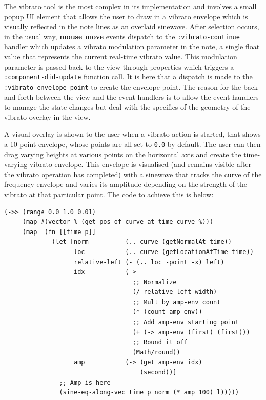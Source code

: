 \documentclass[12pt]{report}
\begin{document}
The vibrato tool is the most complex in its implementation and involves a small
popup UI element that allows the user to draw in a vibrato envelope which is
visually reflected in the note lines as an overlaid sinewave. After selection
occurs, in the usual way, \textbf{mouse move} events dispatch to the
\texttt{:vibrato-continue} handler which updates a vibrato modulation parameter in the
note, a single float value that represents the current real-time vibrato value.
This modulation parameter is passed back to the view through properties which
triggers a \texttt{:component-did-update} function call. It is here that a dispatch is
made to the \texttt{:vibrato-envelope-point} to create the envelope point. The reason
for the back and forth between the view and the event handlers is to allow the
event handlers to manage the state changes but deal with the specifics of the
geometry of the vibrato overlay in the view. 

A visual overlay is shown to the user when a vibrato action is started, that
shows a 10 point envelope, whose points are all set to \texttt{0.0} by default. The
user can then drag varying heights at various points on the horizontal axis
and create the time-varying vibrato envelope. This envelope is visualised (and
remains visible after the vibrato operation has completed) with a sinewave that
tracks the curve of the frequency envelope and varies its amplitude depending on
the strength of the vibrato at that particular point. The code to achieve this
is below:
\begin{footnotesize}
\begin{verbatim}
(->> (range 0.0 1.0 0.01)
     (map #(vector % (get-pos-of-curve-at-time curve %)))
     (map  (fn [[time p]]
             (let [norm          (.. curve (getNormalAt time))
                   loc           (.. curve (getLocationAtTime time))
                   relative-left (- (.. loc -point -x) left)
                   idx           (->
                                   ;; Normalize
                                   (/ relative-left width)
                                   ;; Mult by amp-env count
                                   (* (count amp-env))
                                   ;; Add amp-env starting point
                                   (+ (-> amp-env (first) (first)))
                                   ;; Round it off
                                   (Math/round))
                   amp           (-> (get amp-env idx)
                                     (second))]
               ;; Amp is here
               (sine-eq-along-vec time p norm (* amp 100) l)))))
\end{verbatim}
\end{footnotesize}
\end{document}
